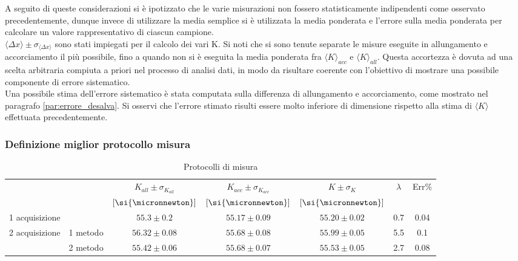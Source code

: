 \documentclass[a4paper,11pt,oneside]{article}
\begin{document}
A seguito di queste considerazioni si è ipotizzato che le varie misurazioni non fossero statisticamente indipendenti come osservato precedentemente, dunque invece di utilizzare la media semplice si è utilizzata la media ponderata e l'errore sulla media ponderata per calcolare un valore rappresentativo di ciascun campione.\\

$\langle \Delta x \rangle \pm \sigma_{\langle \Delta x \rangle}$ sono stati impiegati per il calcolo dei vari K. Si noti che si sono tenute separate le misure eseguite in allungamento e accorciamento il più possibile, fino a quando non si è eseguita la media ponderata  fra ${\langle K \rangle}_{acc}$ e ${\langle K \rangle}_{all}$. Questa accortezza è dovuta ad una scelta arbitraria compiuta a priori nel processo di analisi dati, in modo da risultare coerente con l'obiettivo di mostrare una possibile componente di errore sistematico.\\

Una possibile stima dell'errore sistematico è stata computata sulla differenza di allungamento e accorciamento, come mostrato nel paragrafo \ref{par:errore_desalva}. Si osservi che l'errore stimato risulti essere molto inferiore di dimensione rispetto alla stima di $\langle K \rangle$ effettuata precedentemente. 

\subsubsection*{Definizione miglior protocollo misura}

\begin{table}[h!]
    \centering
    \begin{tabular}{|c|c|c|c|c|c|c|}
        \hline
        \multicolumn{2}{|c|}{} &$K_{all}\pm\sigma_{K_{all}}$& $K_{acc}\pm\sigma_{K_{acc}}$& $K \pm \sigma_K$ & \multirow{2}{*}{$\lambda$} & \multirow{2}{*}{Err\%}\\ 
        \multicolumn{2}{|c|}{} & $[\si{\micronnewton}]$ & $[\si{\micronnewton}]$ &$[\si{\micronnewton}]$ & &\\ \hline
        \multicolumn{2}{|l|}{1 acquisizione} &{\cellcolor[rgb]{0.85,0.85,0.85}}$55.3\pm0.2$ &{\cellcolor[rgb]{0.85,0.85,0.85}}$55.17\pm0.09$ &{\cellcolor[rgb]{0.85,0.85,0.85}} $55.20\pm0.02$ &{\cellcolor[rgb]{0.85,0.85,0.85}} 0.7 &{\cellcolor[rgb]{0.85,0.85,0.85}} 0.04\\ \hline
        \multirow{2}{*}{2 acquisizione} & 1 metodo & $56.32\pm0.08$ & $55.68\pm0.08$ & $55.99\pm0.05$ & 5.5 & 0.1\\ \cline{2-7}
         & 2 metodo &{\cellcolor[rgb]{0.85,0.85,0.85}} $55.42\pm0.06$ &{\cellcolor[rgb]{0.85,0.85,0.85}} $55.68\pm0.07$ & {\cellcolor[rgb]{0.85,0.85,0.85}} $55.53\pm0.05$ &{\cellcolor[rgb]{0.85,0.85,0.85}} 2.7 &{\cellcolor[rgb]{0.85,0.85,0.85}} 0.08\\ \hline
    \end{tabular}
    \caption{Protocolli di misura}
    \label{tab:protocolli}
\end{table}
\end{document}
